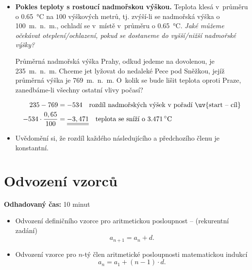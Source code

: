 \documentclass[12pt,a4paper,addpoints]{article}
\begin{document}
\begin{itemize}
\begin{example}
\begin{center}
                    \end{center}
                \end{example}

        \item \textbf{Pokles teploty s rostoucí nadmořskou výškou.} Teplota klesá v~průměru
              o \SI{0,65}{\celsius} na $100$ výškových metrů, tj. zvýší-li se nadmořská výška o 100~m.~n.~m., 
              ochladí se v~místě v~průměru o \SI{0,65}{\celsius}. \textit{Jaké můžeme očekávat oteplení/ochlazení,
              pokud se dostaneme do vyšší/nižší nadmořské výšky?}

              \begin{example}
                Průměrná nadmořská výška Prahy, odkud jedeme na dovolenou, je 235~m.~n.~m. Chceme jet lyžovat
                do nedaleké Pece pod Sněžkou, jejíž průměrná výška je 769~m.~n.~m. O~kolik se bude lišit 
                teplota oproti Praze, zanedbáme-li všechny ostatní vlivy počasí? 
                
                \begin{align*}
                    235 - 769  &= -534 \quad \text{rozdíl nadmořských výšek v pořadí \uv{start -- cíl}}\\
                    -534 \cdot \dfrac{0,65}{100} &= \doubleunderline{-3,471} \quad \text{teplota se sníží o \SI{3,471}{\celsius}} 
                \end{align*}
            \end{example}
        \item Uvědomění si, že rozdíl každého následujícího a předchozího členu je konstantní. 
    \end{itemize}
    
    \section{Odvození vzorců}
    \textbf{Odhadovaný čas:} 10 minut
    \begin{itemize}
        \item Odvození definičního vzorce pro aritmetickou posloupnost -- (rekurentní zadání)
              $$a_{n+1} = a_n + d.$$ 
        \item Odvození vzorce pro $n$-tý člen aritmetické posloupnosti matematickou indukcí 
              $$a_n = a_1 + (n - 1) \cdot d.$$
    \end{itemize}
\end{document}

